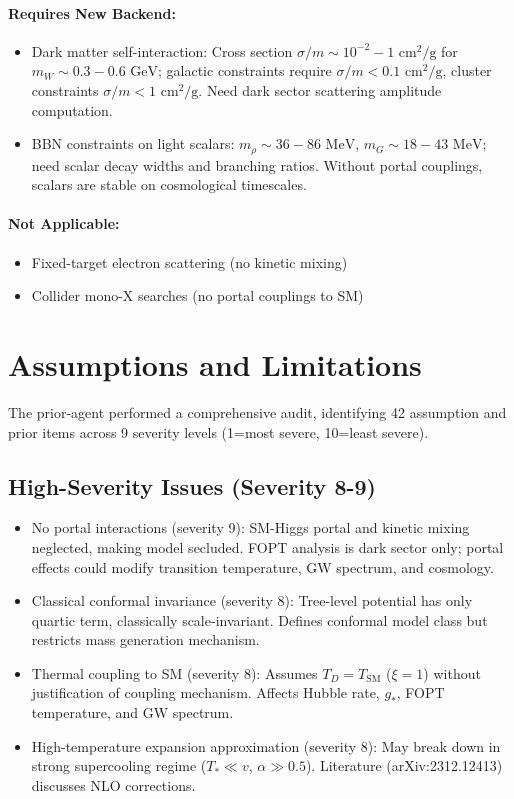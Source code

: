 \documentclass[11pt,a4paper,oneside]{article}
\begin{document}
\paragraph{Requires New Backend:}
\begin{itemize}
\item Dark matter self-interaction: Cross section $\sigma/m \sim 10^{-2}{-}1 \text{ cm}^2/\text{g}$ for $m_W \sim 0.3{-}0.6 \text{ GeV}$; galactic constraints require $\sigma/m < 0.1 \text{ cm}^2/\text{g}$, cluster constraints $\sigma/m < 1 \text{ cm}^2/\text{g}$. Need dark sector scattering amplitude computation.
\item BBN constraints on light scalars: $m_\rho \sim 36{-}86 \text{ MeV}$, $m_G \sim 18{-}43 \text{ MeV}$; need scalar decay widths and branching ratios. Without portal couplings, scalars are stable on cosmological timescales.
\end{itemize}

\paragraph{Not Applicable:}
\begin{itemize}
\item Fixed-target electron scattering (no kinetic mixing)
\item Collider mono-X searches (no portal couplings to SM)
\end{itemize}

\section{Assumptions and Limitations}
\label{sec:assumptions}

The prior-agent performed a comprehensive audit, identifying 42 assumption and prior items across 9 severity levels (1=most severe, 10=least severe).

\subsection{High-Severity Issues (Severity 8-9)}
\begin{itemize}
\item No portal interactions (severity 9): SM-Higgs portal and kinetic mixing neglected, making model secluded. FOPT analysis is dark sector only; portal effects could modify transition temperature, GW spectrum, and cosmology.
\item Classical conformal invariance (severity 8): Tree-level potential has only quartic term, classically scale-invariant. Defines conformal model class but restricts mass generation mechanism.
\item Thermal coupling to SM (severity 8): Assumes $T_D = T_{\text{SM}}$ ($\xi = 1$) without justification of coupling mechanism. Affects Hubble rate, $g_*$, FOPT temperature, and GW spectrum.
\item High-temperature expansion approximation (severity 8): May break down in strong supercooling regime ($T_* \ll v$, $\alpha \gg 0.5$). Literature (arXiv:2312.12413) discusses NLO corrections.
\end{itemize}
\end{document}

